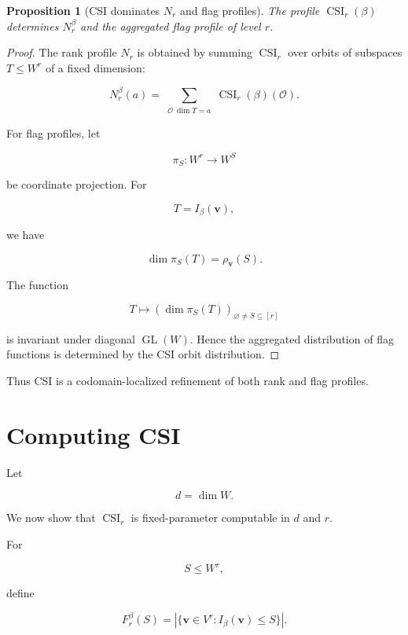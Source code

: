 \documentclass[11pt]{article}
\newtheorem{proposition}[theorem]{Proposition}
\begin{document}
\begin{proposition}[CSI dominates $N_r$ and flag profiles]

The profile $\operatorname{CSI}_r(\beta)$ determines $N_r^\beta$ and the aggregated flag profile of level $r$.

\end{proposition}
\begin{proof}

The rank profile $N_r$ is obtained by summing $\operatorname{CSI}_r$ over orbits of subspaces $T\le W^r$ of a fixed dimension:

\[
N_r^\beta(a)=
\sum_{\substack{\mathcal O\ \dim T=a}}
\operatorname{CSI}_r(\beta)(\mathcal O).
\]

For flag profiles, let

\[
\pi_S:W^r\to W^S
\]

be coordinate projection. For

\[
T=I_\beta(\mathbf v),
\]

we have

\[
\dim \pi_S(T)
=\rho_{\mathbf v}(S).
\]

The function

\[
T\mapsto
(\dim\pi_S(T))_{\varnothing\ne S\subseteq[r]}
\]

is invariant under diagonal $\operatorname{GL}(W)$. Hence the aggregated distribution of flag functions is determined by the CSI orbit distribution.
\end{proof}

Thus CSI is a codomain-localized refinement of both rank and flag profiles.

\section{Computing CSI}

Let

\[
d=\dim W.
\]

We now show that $\operatorname{CSI}_r$ is fixed-parameter computable in $d$ and $r$.

For

\[
S\le W^r,
\]

define

\[
F_r^\beta(S)
=|\{\mathbf v\in V^r:I_\beta(\mathbf v)\le S\}|.
\]
\end{document}
